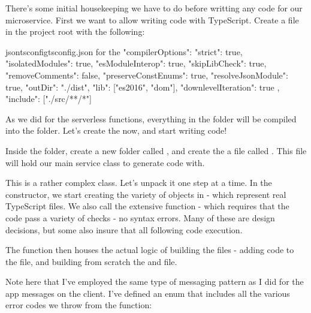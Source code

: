 \documentclass[paper=6in:9in,pagesize=pdftex,headinclude=on,footinclude=on,12pt,twoside]{scrbook}
\begin{document}

There's some initial housekeeping we have to do before writting any code for our microservice. First we want to allow writing code with TypeScript. Create a  file in the project root with the following:

\begin{codeInput}{json}{tsconfig}{tsconfig.json for the  }
{
  "compilerOptions": {
    "strict": true,
    "isolatedModules": true,
    "esModuleInterop": true,
    "skipLibCheck": true,
    "removeComments": false,
    "preserveConstEnums": true,
    "resolveJsonModule": true,
    "outDir": "./dist",
    "lib": ["es2016", "dom"],
    "downlevelIteration": true
  },
  "include": ["./src/**/*"]
}
\end{codeInput}

As we did for the serverless functions, everything in the  folder will be compiled into the  folder. Let's create the  now, and start writing code!


Inside the  folder, create a new folder called , and create the a file called . This file will hold our main service class to generate code with.


This is a rather complex class. Let's unpack it one step at a time. In the constructor, we start creating the variety of  objects in  - which represent real TypeScript files. We also call the extensive  function - which requires that the code pass a variety of checks - no syntax errors. Many of these are design decisions, but some also insure that all following code execution.

The  function then houses the actual logic of building the files - adding code to the  file, and building from scratch the  and  file.

Note here that I've employed the same type of messaging pattern as I did for the app messages on the client. I've defined an  enum that includes all the various error codes we throw from the  function:
\end{document}
